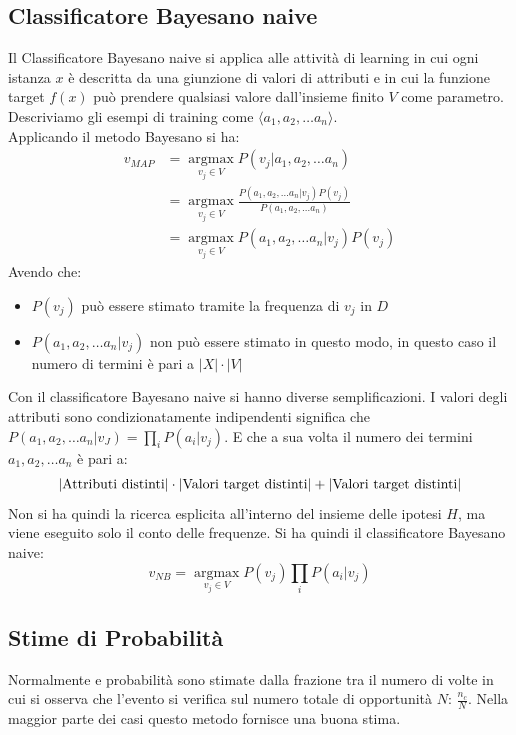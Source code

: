 \subsection{Classificatore Bayesano naive}
Il Classificatore Bayesano naive si applica alle attività di learning in cui ogni istanza $x$ è descritta da una giunzione di valori di attributi e in cui la funzione target $f(x)$ può prendere qualsiasi valore dall'insieme finito $V$ come parametro. Descriviamo gli esempi di training come $\langle a_1, a_2,\ldots a_n\rangle $. \\
Applicando il metodo Bayesano si ha:
\begin{equation*}
    \begin{split}
        v_{MAP}&=\operatorname*{argmax}_{v_j\in V}P(v_j|a_1, a_2,\ldots a_n)\\
        & =\operatorname*{argmax}_{v_j\in V}\frac{P(a_1, a_2,\ldots a_n|v_j)P(v_j)}{P(a_1, a_2,\ldots a_n)}\\
        & =\operatorname*{argmax}_{v_j\in V}P(a_1, a_2,\ldots a_n|v_j)P(v_j)
    \end{split}
\end{equation*}
Avendo che:
\begin{itemize}
    \item $P(v_j)$ può essere stimato tramite la frequenza di $v_j$ in $D$
    \item $P(a_1, a_2,\ldots a_n|v_j)$ non può essere stimato in questo modo, in questo caso il numero di termini è pari a $|X|\cdot |V|$
\end{itemize}
Con il classificatore Bayesano naive si hanno diverse semplificazioni. I valori degli attributi sono condizionatamente indipendenti significa che $P(a_1, a_2,\ldots a_n|v_J)=\prod_iP(a_i|v_j)$. E che a sua volta il numero dei termini $a_1, a_2,\ldots a_n$ è pari a: \[|\textnormal{Attributi distinti}|\cdot |\textnormal{Valori target distinti}|+|\textnormal{Valori target distinti}|\]
Non si ha quindi la ricerca esplicita all'interno del insieme delle ipotesi $H$, ma viene eseguito solo il conto delle frequenze.
Si ha quindi il classificatore Bayesano naive:
\[v_{NB}=\operatorname*{argmax}_{v_j\in V}P(v_j)\prod_iP(a_i|v_j)\]

\subsection{Stime di Probabilità}
Normalmente e probabilità sono stimate dalla frazione tra il numero di volte in cui si osserva che l'evento si verifica sul numero totale di opportunità $N$:
$\frac{n_c}{N}$. Nella maggior parte dei casi questo metodo fornisce una buona stima.\\

